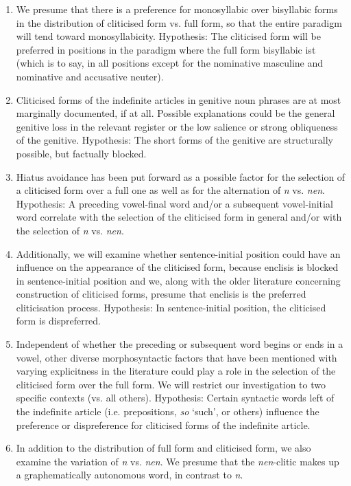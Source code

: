 \begin{enumerate}
	\item We presume that there is a preference for monosyllabic over bisyllabic forms in the distribution of cliticised form vs. full form, so that the entire paradigm will tend toward monosyllabicity.
	Hypothesis: The cliticised form will be preferred in positions in the paradigm where the full form bisyllabic ist (which is to say, in all positions except for the nominative masculine and nominative and accusative neuter).
	\item Cliticised forms of the indefinite articles in genitive noun phrases are at most marginally documented, if at all.
	Possible explanations could be the general genitive loss in the relevant register or the low salience or strong obliqueness of the genitive.
	Hypothesis: The short forms of the genitive are structurally possible, but factually blocked.
	\item Hiatus avoidance has been put forward as a possible factor for the selection of a cliticised form over a full one as well as for the alternation of \textit{n} vs. \textit{nen}.
	Hypothesis: A preceding vowel-final word and/or a subsequent vowel-initial word correlate with the selection of the cliticised form in general and/or with the selection of \textit{n} vs. \textit{nen}.
	\item Additionally, we will examine whether sentence-initial position could have an influence on the appearance of the cliticised form, because enclisis is blocked in sentence-initial position and we, along with the older literature concerning construction of cliticised forms, presume that enclisis is the preferred cliticisation process.
	Hypothesis: In sentence-initial position, the cliticised form is dispreferred.
	\item Independent of whether the preceding or subsequent word begins or ends in a vowel, other diverse morphosyntactic factors that have been mentioned with varying explicitness in the literature could play a role in the selection of the cliticised form over the full form.
	We will restrict our investigation to two specific contexts (vs. all others). 
	Hypothesis: Certain syntactic words left of the indefinite article (i.e. prepositions, \textit{so} `such', or others) influence the preference or dispreference for cliticised forms of the indefinite article.
	\item In addition to the distribution of full form and cliticised form, we also examine the variation of \textit{n} vs. \textit{nen}. 
	We presume that the \textit{nen}-clitic makes up a graphematically autonomous word, in contrast to \textit{n}.

\end{enumerate}
